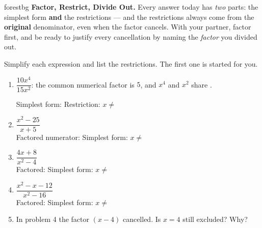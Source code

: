 \documentclass[10pt]{article}
\begin{document}
\namepartnerperiod

\vspace{0.08in}

\begin{headlinebox}{forestbg}
\small\textbf{Factor, Restrict, Divide Out.} Every answer today has \emph{two} parts: the simplest
form \textbf{and} the restrictions --- and the restrictions always come from the \textbf{original}
denominator, even when the factor cancels. With your partner, factor first, and be ready to justify
every cancellation by naming the \emph{factor} you divided out.
\end{headlinebox}

\vspace{0.06in}

\begin{tcolorbox}[colback=white, colframe=black!40, title=\textbf{Tier R --- Remediate},
    fonttitle=\bfseries, arc=1.5mm, left=3mm, right=3mm, top=2mm, bottom=2mm, breakable]
Simplify each expression and list the restrictions. The first one is started for you.

\vspace{4pt}
\begin{enumerate}[leftmargin=1.9em, itemsep=9pt]
  \item $\dfrac{10x^4}{15x^2}$: \; the common numerical factor is $5$, and $x^4$ and $x^2$ share
        .

        Simplest form:  \quad Restriction: $x\neq$ 
  \item $\dfrac{x^2-25}{x+5}$ \\[3pt]
        Factored numerator:  \quad Simplest form:  \quad
        $x\neq$ 
  \item $\dfrac{4x+8}{x^2-4}$ \\[3pt]
        Factored:  \quad Simplest form:  \quad
        $x\neq$ 
  \item $\dfrac{x^2-x-12}{x^2-16}$ \\[3pt]
        Factored:  \quad Simplest form:  \quad
        $x\neq$ 
  \item In problem 4 the factor $(x-4)$ cancelled. Is $x=4$ still excluded?  \;
        Why? 
\end{enumerate}
\end{tcolorbox}
\end{document}
